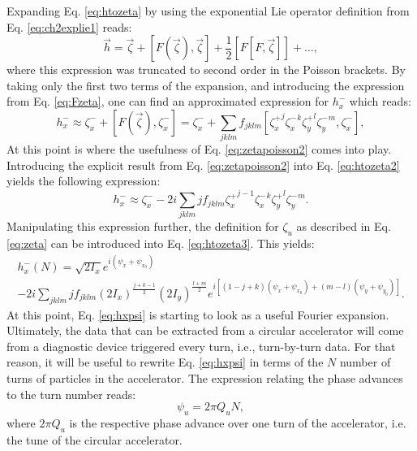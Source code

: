 Expanding Eq. \ref{eq:htozeta} by using the exponential Lie operator definition from Eq. \ref{eq:ch2explie1} reads:
\begin{equation}
    \label{eq:htozetaexpansion}
    \vec{h}=\vec{\zeta}+\left[ F \left(\vec{\zeta}\right), \vec{\zeta}\right]+\frac{1}{2} \left[ F \left[ F , \vec{\zeta}\right] \right] + \dots,
\end{equation}
where this expression was truncated to second order in the Poisson brackets. By taking only the first two terms of the expansion, and introducing the expression from Eq. \ref{eq:Fzeta}, one can find an approximated expression for $h_{x}^{-}$ which reads:
\begin{equation}
    \label{eq:htozeta2}
    h_x^- \approx \zeta_x^{-} + \left[ F \left(\vec{\zeta}\right), \zeta_x^{-}\right] =  \zeta_x^{-} + \sum_{jklm} f_{jklm} \left[ {\zeta_x^{+}}^{j} {\zeta_x^{-}}^k {\zeta_y^{+}}^l {\zeta_y^{-}}^m, \zeta_x^{-}\right],
\end{equation}
At this point is where the usefulness of Eq. \ref{eq:zetapoisson2} comes into play. Introducing the explicit result from Eq. \ref{eq:zetapoisson2} into Eq. \ref{eq:htozeta2} yields the following expression:
\begin{equation}
    \label{eq:htozeta3}
    h_x^- \approx \zeta_x^{-} -2i \sum_{jklm}j f_{jklm} {\zeta_x^{+}}^{j-1} {\zeta_x^{-}}^k {\zeta_y^{+}}^l {\zeta_y^{-}}^m.
\end{equation}
Manipulating this expression further, the definition for $\zeta_u$ as described in Eq. \ref{eq:zeta} can be introduced into Eq. \ref{eq:htozeta3}. This yields:
\begin{multline}
    \label{eq:hxpsi}
    h_x^{-}(N)=\sqrt{2I_x}e^{i\left( \psi_x+\psi_{x_0}\right)} \\
    -2i \sum_{jklm} j f_{jklm} \left( 2I_x \right)^{\frac{j+k-1}{2}}\left( 2I_y \right)^{\frac{l+m}{2}}
    e^{i \left[ \left( 1-j+k\right)\left( \psi_x + \psi_{x_0} \right) +\left( m-l\right)\left( \psi_y + \psi_{y_0} \right)\right]}.
\end{multline}
At this point, Eq. \ref{eq:hxpsi} is starting to look as a useful Fourier expansion. Ultimately, the data that can be extracted from a circular accelerator will come from a diagnostic device triggered every turn, i.e., turn-by-turn data. For that reason, it will be useful to rewrite Eq. \ref{eq:hxpsi} in terms of the $N$ number of turns of particles in the accelerator. The expression relating the phase advances to the turn number reads:
\begin{equation}
    \label{eq:psiu}
    \psi_u=2 \pi Q_u N, 
\end{equation}  
where $2 \pi Q_u$ is the respective phase advance over one turn of the accelerator, i.e. the tune of the circular accelerator.

